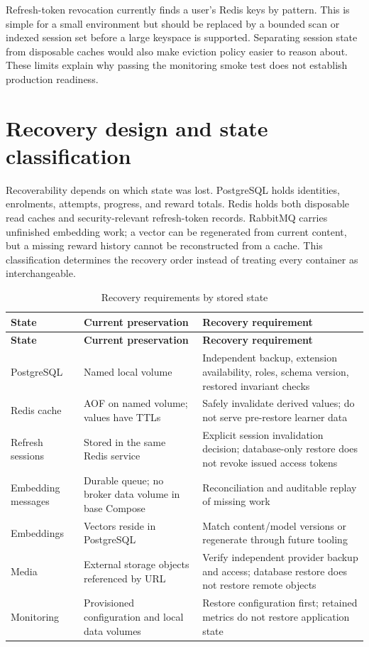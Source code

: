 \documentclass[12pt,a4paper,oneside]{report}
\begin{document}
Refresh-token revocation currently finds a user's Redis keys by pattern. This is simple
for a small environment but should be replaced by a bounded scan or indexed session set
before a large keyspace is supported. Separating session state from disposable caches
would also make eviction policy easier to reason about. These limits explain why passing
the monitoring smoke test does not establish production readiness.

\section{Recovery design and state classification}
\label{sec:recovery-design}
Recoverability depends on which state was lost. PostgreSQL holds identities,
enrolments, attempts, progress, and reward totals. Redis holds both disposable read
caches and security-relevant refresh-token records. RabbitMQ carries unfinished
embedding work; a vector can be regenerated from current content, but a missing
reward history cannot be reconstructed from a cache. This classification determines
the recovery order instead of treating every container as interchangeable.

\begin{longtable}{P{0.20\textwidth}P{0.34\textwidth}P{0.35\textwidth}}
\caption{Recovery requirements by stored state}\label{tab:recovery-state}\\\toprule
\textbf{State} & \textbf{Current preservation} & \textbf{Recovery requirement}\\\midrule\endfirsthead
\toprule\textbf{State} & \textbf{Current preservation} & \textbf{Recovery requirement}\\\midrule\endhead
PostgreSQL & Named local volume & Independent backup, extension availability, roles, schema version, restored invariant checks\\
Redis cache & AOF on named volume; values have TTLs & Safely invalidate derived values; do not serve pre-restore learner data\\
Refresh sessions & Stored in the same Redis service & Explicit session invalidation decision; database-only restore does not revoke issued access tokens\\
Embedding messages & Durable queue; no broker data volume in base Compose & Reconciliation and auditable replay of missing work\\
Embeddings & Vectors reside in PostgreSQL & Match content/model versions or regenerate through future tooling\\
Media & External storage objects referenced by URL & Verify independent provider backup and access; database restore does not restore remote objects\\
Monitoring & Provisioned configuration and local data volumes & Restore configuration first; retained metrics do not restore application state\\
\bottomrule
\end{longtable}
\end{document}
